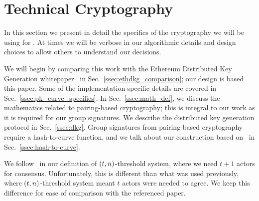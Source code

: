 \section{Technical Cryptography}
\label{sec:tech_crypto}

In this section we present in detail the specifics of the
cryptography we will be using for \LayerTwoLong{}.
At times we will be verbose in our algorithmic details
and design choices to allow others to understand our decisions.

We will begin by comparing this work with the
Ethereum Distributed Key Generation whitepaper~\cite{ethdkg}
in Sec.~\ref{ssec:ethdkg_comparison};
our design is based this paper.
Some of the implementation-specific details are covered in
Sec.~\ref{ssec:pk_curve_specifics}.
In Sec.~\ref{ssec:math_def}, we discuss the mathematics
related to pairing-based cryptography; this is integral to
our work as it is required for our group signatures.
We describe the distributed key generation protocol in
Sec.~\ref{ssec:dkg}.
Group signatures from pairing-based cryptography require
a hash-to-curve function, and we talk about our construction
based on~\cite{ft2012bnhashtocurve,boneh2019h2cBLS12}
in Sec.~\ref{ssec:hash-to-curve}.

We follow~\cite{ethdkg} in our definition of
$\left( t,n \right)$-threshold system, where we need $t+1$ actors
for consensus.
Unfortunately, this is different than what was used previously,
where $\left( t,n \right)$-threshold system meant $t$ actors were
needed to agree.
We keep this difference for ease of comparison with the referenced paper.







